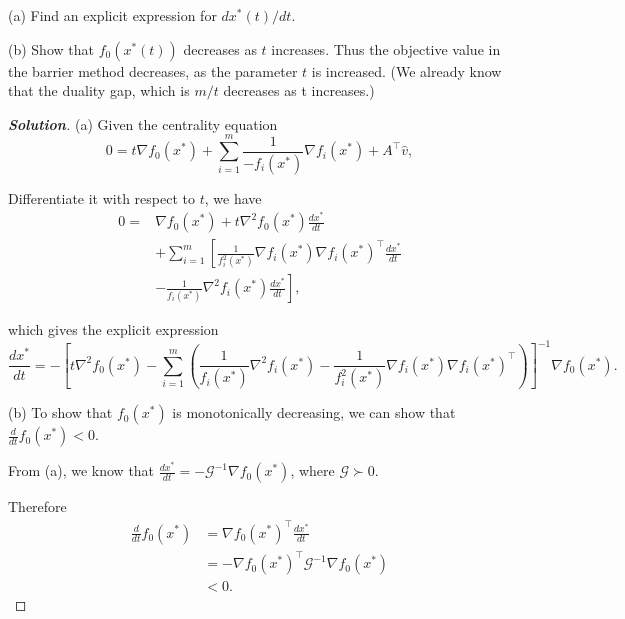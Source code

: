 \documentclass[11pt]{article}
\newenvironment{solution}
  {\renewcommand\qedsymbol{$\square$}\begin{proof}[\textbf{Solution}]}
  {\end{proof}}
\newcommand{\grad}{\nabla}
\newcommand{\inv}{^{-1}}        %
\begin{document}
(a) Find an explicit expression for $dx^*(t)/dt$.

(b) Show that $f_0(x^*(t))$ decreases as $t$ increases. Thus the objective value in the barrier method decreases, as the parameter $t$ is increased. (We already know that the duality gap, which is $m/t$ decreases as t increases.)

\begin{solution}
    (a) Given the centrality equation
    $$
    0=t \nabla f_0\left(x^*\right)+\sum_{i=1}^m \frac{1}{-f_i\left(x^*\right)} \nabla f_i\left(x^*\right)+A^{\top} \hat{v},
    $$
    
    Differentiate it with respect to $t$, we have    
    $$
    \begin{aligned}
    0 = &\nabla f_0\left(x^*\right) + t \nabla^2 f_0\left(x^*\right) \frac{d x^*}{d t} \\
    &+ \sum_{i=1}^m\left[\frac{1}{f_i^2\left(x^*\right)} \nabla f_i\left(x^*\right) \nabla f_i\left(x^*\right)^{\top} \frac{d x^*}{d t}\right. \\
    & \left.-\frac{1}{f_i\left(x^*\right)} \nabla^2 f_i\left(x^*\right) \frac{d x^*}{d t}\right],
    \end{aligned}
    $$
    
    which gives the explicit expression    
    $$
    \frac{d x^*}{d t}=-\left[t \nabla^2 f_0\left(x^*\right)-\sum_{i=1}^m\left(\frac{1}{f_i\left(x^*\right)} \nabla^2 f_i\left(x^*\right)-\frac{1}{f_i^2\left(x^*\right)} \nabla f_i\left(x^*\right) \nabla f_i\left(x^*\right)^{\top}\right)\right]^{-1} \nabla f_0\left(x^*\right) .
    $$
    
    (b) To show that $f_0(x^*)$ is monotonically decreasing, we can show that $\frac{d}{d t} f_0\left(x^*\right) < 0$.
    
    From (a), we know that $ \frac{d x^*}{d t} = - \mathcal{G}\inv \grad f_0(x^*)$, where $\mathcal{G}\succ 0$.
    
    Therefore    
    $$
    \begin{aligned}
    \frac{d}{d t} f_0\left(x^*\right) & =\nabla f_0\left(x^*\right)^{\top} \frac{d x^*}{d t} \\
    & =-\nabla f_0\left(x^*\right)^{\top} \mathcal{G}^{-1} \nabla f_0\left(x^*\right) \\
    & < 0 .
    \end{aligned}
    $$
\end{solution}
\end{document}
